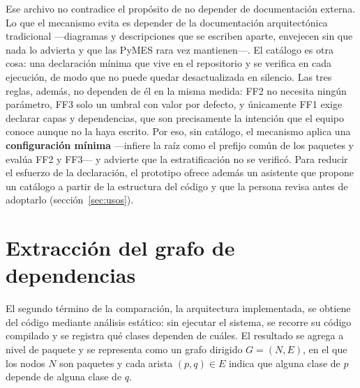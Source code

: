 Ese archivo no contradice el propósito de no depender de documentación externa. Lo que el mecanismo evita es depender de la documentación arquitectónica tradicional ---diagramas y descripciones que se escriben aparte, envejecen sin que nada lo advierta y que las PyMES rara vez mantienen---. El catálogo es otra cosa: una declaración mínima que vive en el repositorio y se verifica en cada ejecución, de modo que no puede quedar desactualizada en silencio. Las tres reglas, además, no dependen de él en la misma medida: FF2 no necesita ningún parámetro, FF3 solo un umbral con valor por defecto, y únicamente FF1 exige declarar capas y dependencias, que son precisamente la intención que el equipo conoce aunque no la haya escrito. Por eso, sin catálogo, el mecanismo aplica una \textbf{configuración mínima} ---infiere la raíz como el prefijo común de los paquetes y evalúa FF2 y FF3--- y advierte que la estratificación no se verificó. Para reducir el esfuerzo de la declaración, el prototipo ofrece además un asistente que propone un catálogo a partir de la estructura del código y que la persona revisa antes de adoptarlo (sección~\ref{sec:usos}).

\section{Extracción del grafo de dependencias}
\label{sec:extraccion}
El segundo término de la comparación, la arquitectura implementada, se obtiene del código mediante análisis estático: sin ejecutar el sistema, se recorre su código compilado y se registra qué clases dependen de cuáles. El resultado se agrega a nivel de paquete y se representa como un grafo dirigido $G = (N, E)$, en el que los nodos $N$ son paquetes y cada arista $(p, q) \in E$ indica que alguna clase de $p$ depende de alguna clase de $q$.


